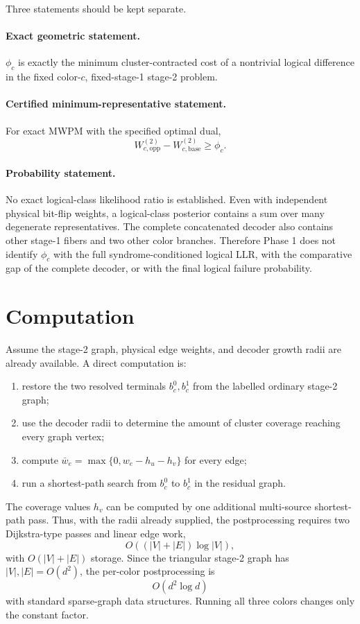 \documentclass[11pt]{article}
\begin{document}
Three statements should be kept separate.

\paragraph{Exact geometric statement.}
$\phi_c$ is exactly the minimum cluster-contracted cost of a nontrivial
logical difference in the fixed color-$c$, fixed-stage-1 stage-2 problem.

\paragraph{Certified minimum-representative statement.}
For exact MWPM with the specified optimal dual,
\[
  W_{c,\mathrm{opp}}^{(2)}-W_{c,\mathrm{base}}^{(2)}\ge\phi_c.
\]

\paragraph{Probability statement.}
No exact logical-class likelihood ratio is established. Even with independent
physical bit-flip weights, a logical-class posterior contains a sum over many
degenerate representatives. The complete concatenated decoder also contains
other stage-1 fibers and two other color branches. Therefore Phase 1 does not
identify $\phi_c$ with the full syndrome-conditioned logical LLR, with the
comparative gap of the complete decoder, or with the final logical failure
probability.

\section{Computation}

Assume the stage-2 graph, physical edge weights, and decoder growth radii are
already available. A direct computation is:
\begin{enumerate}
  \item restore the two resolved terminals $b_c^0,b_c^1$ from the labelled
        ordinary stage-2 graph;
  \item use the decoder radii to determine the amount of cluster coverage
        reaching every graph vertex;
  \item compute $\bar w_e=\max\{0,w_e-h_u-h_v\}$ for every edge;
  \item run a shortest-path search from $b_c^0$ to $b_c^1$ in the residual
        graph.
\end{enumerate}

The coverage values $h_v$ can be computed by one additional multi-source
shortest-path pass. Thus, with the radii already supplied, the postprocessing
requires two Dijkstra-type passes and linear edge work,
\[
  O\!\left((|V|+|E|)\log |V|\right),
\]
with $O(|V|+|E|)$ storage. Since the triangular stage-2 graph has
$|V|,|E|=O(d^2)$, the per-color postprocessing is
\[
  O(d^2\log d)
\]
with standard sparse-graph data structures. Running all three colors changes
only the constant factor.
\end{document}
